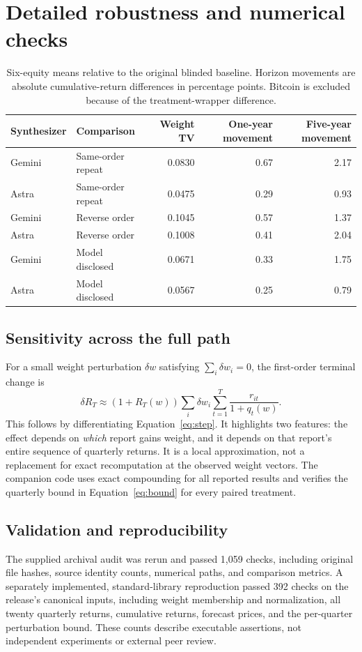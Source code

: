 \documentclass[11pt]{article}
\begin{document}
\section{Detailed robustness and numerical checks}
\begin{table}[ht]
\centering\small
\begin{tabular}{@{}llrrr@{}}
\toprule
Synthesizer & Comparison & Weight TV & One-year movement & Five-year movement \\
\midrule
Gemini & Same-order repeat & 0.0830 & 0.67 & 2.17 \\
Astra & Same-order repeat & 0.0475 & 0.29 & 0.93 \\
Gemini & Reverse order & 0.1045 & 0.57 & 1.37 \\
Astra & Reverse order & 0.1008 & 0.41 & 2.04 \\
Gemini & Model disclosed & 0.0671 & 0.33 & 1.75 \\
Astra & Model disclosed & 0.0567 & 0.25 & 0.79 \\
\bottomrule
\end{tabular}
\caption{Six-equity means relative to the original blinded baseline. Horizon movements are absolute cumulative-return differences in percentage points. Bitcoin is excluded because of the treatment-wrapper difference.}
\end{table}

\subsection{Sensitivity across the full path}
For a small weight perturbation $\delta w$ satisfying $\sum_i\delta w_i=0$, the first-order terminal change is
\begin{equation}
\delta R_T\approx (1+R_T(w))\sum_i\delta w_i\sum_{t=1}^{T}\frac{r_{it}}{1+q_t(w)}.
\end{equation}
This follows by differentiating Equation~\ref{eq:step}. It highlights two features: the effect depends on \emph{which} report gains weight, and it depends on that report's entire sequence of quarterly returns. It is a local approximation, not a replacement for exact recomputation at the observed weight vectors. The companion code uses exact compounding for all reported results and verifies the quarterly bound in Equation~\ref{eq:bound} for every paired treatment.

\subsection{Validation and reproducibility}
The supplied archival audit was rerun and passed 1,059 checks, including original file hashes, source identity counts, numerical paths, and comparison metrics. A separately implemented, standard-library reproduction passed 392 checks on the release's canonical inputs, including weight membership and normalization, all twenty quarterly returns, cumulative returns, forecast prices, and the per-quarter perturbation bound. These counts describe executable assertions, not independent experiments or external peer review.
\end{document}
